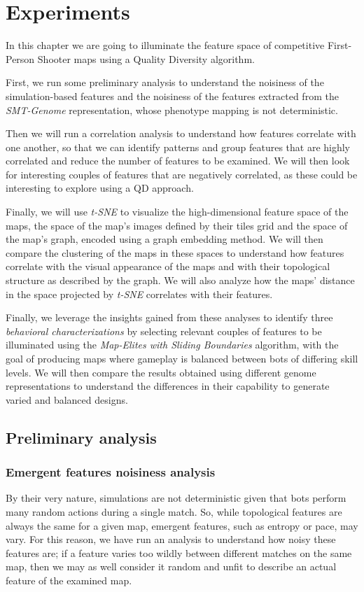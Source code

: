 \chapter{Experiments}
In this chapter we are going to illuminate the feature space of competitive First-Person Shooter maps using a Quality Diversity algorithm.

First, we run some preliminary analysis to understand the noisiness of the simulation-based features and the noisiness of the features extracted from the \textit{SMT-Genome} representation, whose phenotype mapping is not deterministic.

Then we will run a correlation analysis to understand how features correlate with one another, so that we can identify patterns and group features that are highly correlated and reduce the number of features to be examined. We will then look for interesting couples of features that are negatively correlated, as these could be interesting to explore using a QD approach.

Finally, we will use \textit{t-SNE} to visualize the high-dimensional feature space of the maps, the space of the map's images defined by their tiles grid and the space of the map's graph, encoded using a graph embedding method. We will then compare the clustering of the maps in these spaces to understand how features correlate with the visual appearance of the maps and with their topological structure as described by the graph. We will also analyze how the maps' distance in the space projected by \textit{t-SNE} correlates with their features.

Finally, we leverage the insights gained from these analyses to identify three \textit{behavioral characterizations} by selecting relevant couples of features to be illuminated using the \textit{Map-Elites with Sliding Boundaries} algorithm, with the goal of producing maps where gameplay is balanced between bots of differing skill levels. We will then compare the results obtained using different genome representations to understand the differences in their capability to generate varied and balanced designs.

\section{Preliminary analysis}
\subsection{Emergent features noisiness analysis}
\label{subsec:emergent_features_noisiness}
By their very nature, simulations are not deterministic given that bots perform many random actions during a single match. So, while topological features are always the same for a given map, emergent features, such as entropy or pace, may vary. For this reason, we have run an analysis to understand how noisy these features are; if a feature varies too wildly between different matches on the same map, then we may as well consider it random and unfit to describe an actual feature of the examined map.

